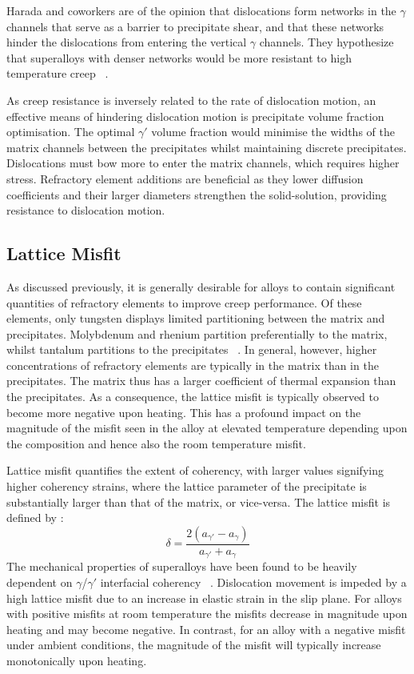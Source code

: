 Harada and coworkers are of the opinion that dislocations form networks in the $\gamma$ channels that serve as a barrier to precipitate shear, and that these networks hinder the dislocations from entering the vertical $\gamma$ channels.  They hypothesize that superalloys with denser networks would be more resistant to high temperature creep ~\cite{harada06}.

As creep resistance is inversely related to the rate of dislocation motion, an effective means of hindering dislocation motion is precipitate volume fraction optimisation.  The optimal $\gamma'$ volume fraction would minimise the widths of the matrix channels between the precipitates whilst maintaining discrete precipitates.  Dislocations must bow more to enter the matrix channels, which requires higher stress.  Refractory element additions are beneficial as they lower diffusion coefficients and their larger diameters strengthen the solid-solution, providing resistance to dislocation motion.


\subsection{Lattice Misfit}

As discussed previously, it is generally desirable for alloys to contain significant quantities of refractory elements to improve creep performance.  Of these elements, only tungsten displays limited partitioning between the matrix and precipitates.  Molybdenum and rhenium partition preferentially to the matrix, whilst tantalum partitions to the precipitates ~\cite{reed04}.  In general, however, higher concentrations of refractory elements are typically in the matrix than in the precipitates.  The matrix thus has a larger coefficient of thermal expansion than the precipitates.  As a consequence, the lattice misfit is typically observed to become more negative upon heating.  This has a profound impact on the magnitude of the misfit seen in the alloy at elevated temperature depending upon the composition and hence also the room temperature misfit.

Lattice misfit quantifies the extent of coherency, with larger values signifying higher coherency strains, where the lattice parameter of the precipitate is substantially larger than that of the matrix, or vice-versa.  The lattice misfit is defined by \cite{nabarro96}:
%
\begin{equation}
\delta = \frac{2(a_{\gamma'} - a_\gamma)}{a_{\gamma'} + a_\gamma}
\label{eq:misfit}
\end{equation}
%
The mechanical properties of superalloys have been found to be heavily dependent on $\gamma$/$\gamma'$ interfacial coherency ~\cite{reed06}.  Dislocation movement is impeded by a high lattice misfit due to an increase in elastic strain in the slip plane.  For alloys with positive misfits at room temperature the misfits decrease in magnitude upon heating and may become negative.  In contrast, for an alloy with a negative misfit under ambient conditions, the magnitude of the misfit will typically increase monotonically upon heating. 

